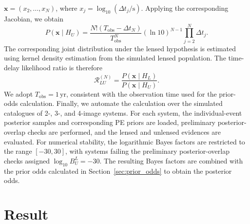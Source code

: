 \documentclass[linenumbers,amsmath,trackchanges]{aastex702}
\begin{document}
\(\boldsymbol{x}=(x_2,\ldots,x_N)\), where \(x_j=\log_{10}(\Delta t_j/\mathrm{s})\). Applying the 
corresponding Jacobian, we obtain
\[
P(\boldsymbol{x}\mid H_U) = \frac{N!(T_{\mathrm{obs}}-\Delta t_N)}{T_{\mathrm{obs}}^N}
(\ln 10)^{N-1}\prod_{j=2}^{N}\Delta t_j.
\]
The corresponding joint distribution under the lensed hypothesis is estimated using kernel density 
estimation from the simulated lensed population. The time-delay likelihood ratio is therefore
\[
\mathcal R_{LU}^{(N)} = \frac{P(\boldsymbol{x}\mid H_L)}{P(\boldsymbol{x}\mid H_U)}.
\]
We adopt \(T_{\mathrm{obs}}=1\,\mathrm{yr}\), consistent with the observation time used for the 
prior-odds calculation. 
Finally, we automate the calculation over the simulated catalogues of 2-, 3-, and 4-image systems. For 
each system, the individual-event posterior samples and corresponding PE priors are loaded, preliminary 
posterior-overlap checks are performed, and the lensed and unlensed evidences are evaluated. For 
numerical stability, the logarithmic Bayes factors are restricted to the range $[-30,30]$, with systems 
failing the preliminary posterior-overlap checks assigned $\log_{10} B_U^L = -30$. The resulting Bayes 
factors are combined with the prior odds calculated in Section~\ref{sec:prior_odds} to obtain the 
posterior odds.

\section{Result}
\end{document}
